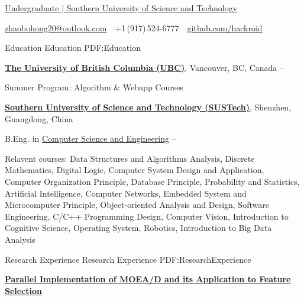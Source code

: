 \documentclass[a4paper,MMMyyyy,nonstopmode]{simpleresumecv}
\newcommand{\CVAuthor}{Bohong ZHAO}
\begin{document}

\Title{\CVAuthor}

\begin{SubTitle}
\href{https://sustech.edu.cn/}
{Undergraduate | Southern University of Science and Technology}
\par
\href{mailto:zhaobohong20@outlook.com}
{zhaobohong20@outlook.com}
\,\SubBulletSymbol\,
+1\,(917)\,524-6777
\,\SubBulletSymbol\,
\href{https://github.com/hackroid/}{github.com/hackroid}
\end{SubTitle}

\begin{Body}


\Section
{Education}
{Education}
{PDF:Education}

\Entry
\href{https://www.ubc.ca/}
{\textbf{The University of British Columbia (UBC)}},
Vancouver, BC, Canada
\hfill
{} --

\BulletItem
Summer Program: Algorithm \& Webapp Courses

\Gap
\Entry
\href{https://www.sustech.edu.cn/}
{\textbf{Southern University of Science and Technology (SUSTech)}},
Shenzhen, Guangdong, China

\Gap
\BulletItem
B.Eng. in
\href{http://cse.sustech.edu.cn/}
{Computer Science and Engineering}
\hfill
{} --
\begin{Detail}
\SubBulletItem
Relavent courses:
Data Structures and Algorithms Analysis,
Discrete Mathematics,
Digital Logic,
Computer System Design and Application,
Computer Organization Principle,
Database Principle,
Probability and Statistics,
Artificial Intelligence,
Computer Networks,
Embedded System and Microcomputer Principle,
Object-oriented Analysis and Design,
Software Engineering,
C/C++ Programming Design,
Computer Vision,
Introduction to Cognitive Science,
Operating System,
Robotics,
Introduction to Big Data Analysis
\end{Detail}


\Section
{Research Experience}
{Research Experience}
{PDF:ResearchExperience}

\Entry
\href{https://github.com/hackroid/pMOEA-D}
{\textbf{Parallel Implementation of MOEA/D and its Application to Feature Selection}}


\end{Body}
\end{document}
